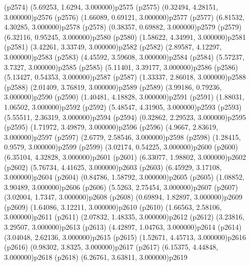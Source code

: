 \psdot(p2574)
\psPoint(5.69253, 1.6294, 3.000000){p2575}
\psdot(p2575)
\psPoint(0.32494, 4.28151, 3.000000){p2576}
\psdot(p2576)
\psPoint(1.66089, 0.69121, 3.000000){p2577}
\psdot(p2577)
\psPoint(6.81532, 4.30285, 3.000000){p2578}
\psdot(p2578)
\psPoint(0.38357, 0.69882, 3.000000){p2579}
\psdot(p2579)
\psPoint(6.32116, 0.95245, 3.000000){p2580}
\psdot(p2580)
\psPoint(1.58622, 4.34991, 3.000000){p2581}
\psdot(p2581)
\psPoint(3.42261, 3.33749, 3.000000){p2582}
\psdot(p2582)
\psPoint(2.89587, 4.12297, 3.000000){p2583}
\psdot(p2583)
\psPoint(4.45592, 3.59608, 3.000000){p2584}
\psdot(p2584)
\psPoint(5.57237, 3.7327, 3.000000){p2585}
\psdot(p2585)
\psPoint(5.11401, 3.39177, 3.000000){p2586}
\psdot(p2586)
\psPoint(5.13427, 0.54353, 3.000000){p2587}
\psdot(p2587)
\psPoint(1.33337, 2.86018, 3.000000){p2588}
\psdot(p2588)
\psPoint(2.01409, 3.76819, 3.000000){p2589}
\psdot(p2589)
\psPoint(3.99186, 0.79236, 3.000000){p2590}
\psdot(p2590)
\psPoint(1.40481, 4.18828, 3.000000){p2591}
\psdot(p2591)
\psPoint(1.88031, 1.06502, 3.000000){p2592}
\psdot(p2592)
\psPoint(5.48547, 4.31905, 3.000000){p2593}
\psdot(p2593)
\psPoint(5.55511, 2.36319, 3.000000){p2594}
\psdot(p2594)
\psPoint(0.32862, 2.29523, 3.000000){p2595}
\psdot(p2595)
\psPoint(1.71972, 3.49879, 3.000000){p2596}
\psdot(p2596)
\psPoint(4.9667, 2.83619, 3.000000){p2597}
\psdot(p2597)
\psPoint(2.6779, 2.58546, 3.000000){p2598}
\psdot(p2598)
\psPoint(1.28415, 0.9579, 3.000000){p2599}
\psdot(p2599)
\psPoint(3.02174, 0.54225, 3.000000){p2600}
\psdot(p2600)
\psPoint(6.35104, 4.32828, 3.000000){p2601}
\psdot(p2601)
\psPoint(6.33077, 1.98802, 3.000000){p2602}
\psdot(p2602)
\psPoint(5.76734, 4.41625, 3.000000){p2603}
\psdot(p2603)
\psPoint(6.45929, 3.17108, 3.000000){p2604}
\psdot(p2604)
\psPoint(0.84786, 1.58792, 3.000000){p2605}
\psdot(p2605)
\psPoint(1.08852, 3.90489, 3.000000){p2606}
\psdot(p2606)
\psPoint(5.5263, 2.75454, 3.000000){p2607}
\psdot(p2607)
\psPoint(3.02004, 1.7347, 3.000000){p2608}
\psdot(p2608)
\psPoint(0.69894, 1.82897, 3.000000){p2609}
\psdot(p2609)
\psPoint(1.64086, 3.12211, 3.000000){p2610}
\psdot(p2610)
\psPoint(1.66563, 2.58106, 3.000000){p2611}
\psdot(p2611)
\psPoint(2.07832, 1.48335, 3.000000){p2612}
\psdot(p2612)
\psPoint(3.23816, 3.29507, 3.000000){p2613}
\psdot(p2613)
\psPoint(4.42897, 1.04763, 3.000000){p2614}
\psdot(p2614)
\psPoint(3.04048, 2.62136, 3.000000){p2615}
\psdot(p2615)
\psPoint(1.52671, 4.45713, 3.000000){p2616}
\psdot(p2616)
\psPoint(0.98302, 3.8325, 3.000000){p2617}
\psdot(p2617)
\psPoint(6.15375, 4.44848, 3.000000){p2618}
\psdot(p2618)
\psPoint(6.26761, 3.63811, 3.000000){p2619}

